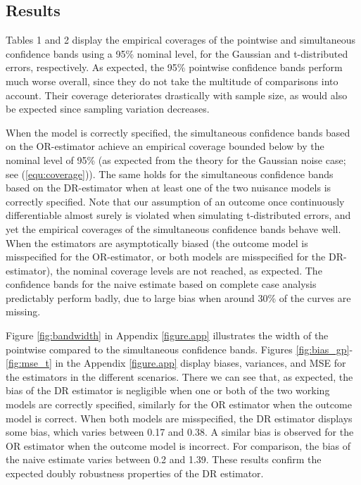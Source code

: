 \documentclass[12pt, A4]{article}
\begin{document}
        \subsection{Results}
        Tables 1 and 2 display the empirical coverages of the pointwise and simultaneous confidence bands using a 95\% nominal level, for the Gaussian and t-distributed errors, respectively. 
        As expected, the 95\% pointwise confidence bands perform much worse overall, since they do not take the multitude of comparisons into account. 
        Their coverage deteriorates drastically with sample size, as would also be expected since sampling variation decreases.

        When the model is correctly specified, the simultaneous confidence bands based on the OR-estimator achieve an empirical coverage bounded below by the nominal level of 95\% (as expected from the theory for the Gaussian noise case; see (\ref{equ:coverage})). 
        The same holds for the simultaneous confidence bands based on the DR-estimator when at least one of the two nuisance models is correctly specified. Note that our assumption of an outcome once continuously differentiable almost surely is violated when simulating t-distributed errors, and yet the empirical coverages of the simultaneous confidence bands behave well. 
        When the estimators are asymptotically biased (the outcome model is misspecified for the OR-estimator, or both models are misspecified for the DR-estimator), the nominal coverage levels are not reached, as expected. The confidence bands for the naive estimate based on complete case analysis predictably perform badly, due to large bias when around 30\% of the curves are missing. 
        
        Figure \ref{fig:bandwidth} in Appendix \ref{figure.app} illustrates the width of the pointwise compared to the simultaneous confidence bands. Figures \ref{fig:bias_gp}-\ref{fig:mse_t} in the Appendix \ref{figure.app} display biases, variances, and MSE for the estimators in the different scenarios. 
        There we can see that, as expected, the bias of the DR estimator is negligible when one or both of the two working models are correctly specified, similarly for the OR estimator when the outcome model is correct. 
        When both models are misspecified, the DR estimator displays some bias, which varies between 0.17 and 0.38. 
        A similar bias is observed for the OR estimator when the outcome model is incorrect. 
        For comparison, the bias of the naive estimate varies between 0.2 and 1.39. 
        These results confirm the expected doubly robustness properties of the DR estimator.
\end{document}
